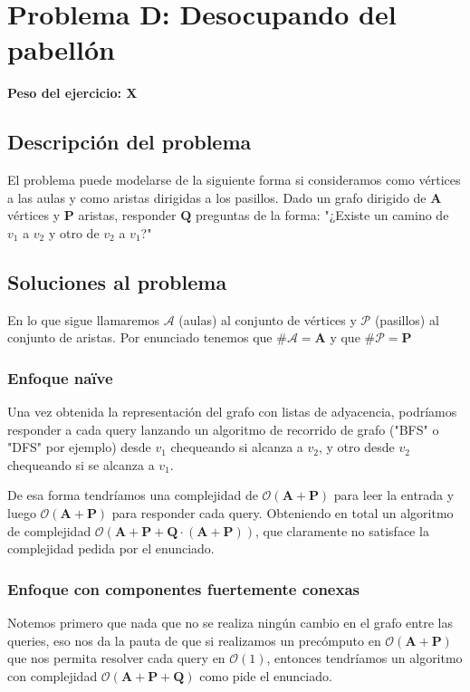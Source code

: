 \newpage{}
\section{Problema D: Desocupando del pabellón}
\textbf{Peso del ejercicio: X}
\subsection{Descripción del problema}

El problema puede modelarse de la siguiente forma si consideramos como vértices a las aulas y como aristas dirigidas a los pasillos. Dado un grafo dirigido de $\textbf{A}$ vértices y $\textbf{P}$ aristas, responder $\textbf{Q}$ preguntas de la forma: "¿Existe un camino de $v_1$ a $v_2$ y otro de $v_2$ a $v_1$?"
\subsection{Soluciones al problema}

En lo que sigue llamaremos $\mathcal{A}$ (aulas) al conjunto de vértices y $\mathcal{P}$ (pasillos) al conjunto de aristas. Por enunciado tenemos que $\# \mathcal{A} = \textbf{A}$ y que $\# \mathcal{P} = \textbf{P}$

\subsubsection{Enfoque naïve}

Una vez obtenida la representación del grafo con listas de adyacencia, podríamos responder a cada query lanzando un algoritmo de recorrido de grafo ("BFS" o "DFS" por ejemplo) desde $v_1$ chequeando si alcanza a $v_2$, y otro desde $v_2$ chequeando si se alcanza a $v_1$. 

De esa forma tendríamos una complejidad de  $\mathcal{O} \left (\textbf{A} + \textbf{P} \right ) $ para leer la entrada y luego  $\mathcal{O} \left (\textbf{A} + \textbf{P} \right )$ para responder cada query. Obteniendo en total un algoritmo de complejidad $\mathcal{O} \left (\textbf{A} + \textbf{P} + \textbf{Q} \cdot \left ( \textbf{A} + \textbf{P} \right ) \right )$, que claramente no satisface la complejidad pedida por el enunciado.

\subsubsection{Enfoque con componentes fuertemente conexas}

Notemos primero que nada que no se realiza ningún cambio en el grafo entre las queries, eso nos da la pauta de que si realizamos un precómputo en $\mathcal{O}(\textbf{A} + \textbf{P})$ que nos permita resolver cada query en $\mathcal{O}(1)$, entonces tendríamos un algoritmo con complejidad $\mathcal{O}(\textbf{A} + \textbf{P} + \textbf{Q})$ como pide el enunciado.

